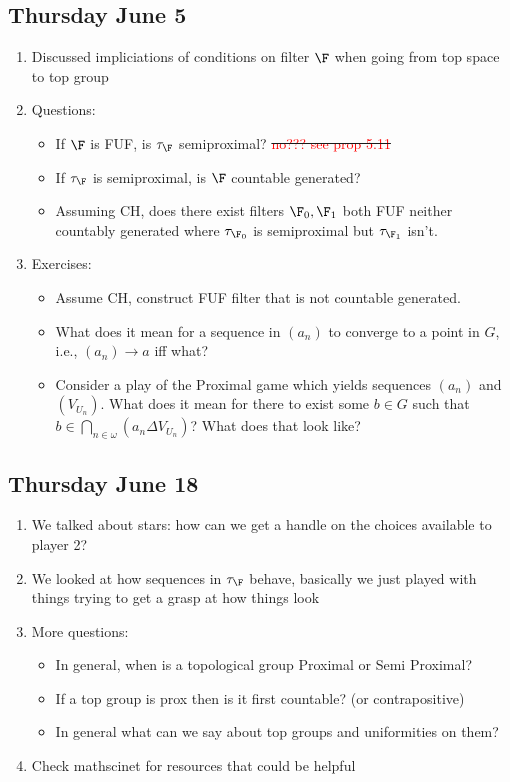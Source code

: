 \documentclass{article}
\begin{document}
\subsection*{Thursday June 5}
\begin{enumerate}
    \item Discussed impliciations of conditions on filter \(\F\) when going from top space to top group 
    \item Questions:
    \begin{itemize}
        \item If \(\F\) is FUF, is \(\tau_{\F}\) semiproximal? \sout{\textcolor{red}{no??? see prop 5.11}}
        \item If \(\tau_{\F}\) is semiproximal, is \(\F\) countable generated?
        \item Assuming CH, does there exist filters \(\F_0, \F_1\) both FUF neither countably generated where \(\tau_{\F_0}\) is semiproximal but \(\tau_{\F_1}\) isn't.
    \end{itemize}    
    \item Exercises: 
    \begin{itemize}
        \item Assume CH, construct FUF filter that is not countable generated. \checkmark
        \item What does it mean for a sequence in \((a_n)\) to converge to a point in \(G\), i.e., \((a_n)\to a\) iff what? 
        \item Consider a play of the Proximal game which yields sequences \((a_n)\) and \((V_{U_n})\). What does it mean for there to exist some \(b \in G\) such that \(b \in \bigcap_{n \in \omega}(a_n \Delta V_{U_n})\)? What does that look like?
    \end{itemize}
    \end{enumerate}

\subsection*{Thursday June 18}
\begin{enumerate}
    \item We talked about stars: how can we get a handle on the choices available to player 2?
    \item We looked at how sequences in \(\tau_{\F}\) behave, basically we just played with things trying to get a grasp at how things look
    \item More questions:
    \begin{itemize}
        \item In general, when is a topological group Proximal or Semi Proximal?
        \item If a top group is prox then is it first countable? (or contrapositive)
        \item In general what can we say about top groups and uniformities on them?
    \end{itemize}
    \item Check mathscinet for resources that could be helpful
\end{enumerate}
\end{document}
